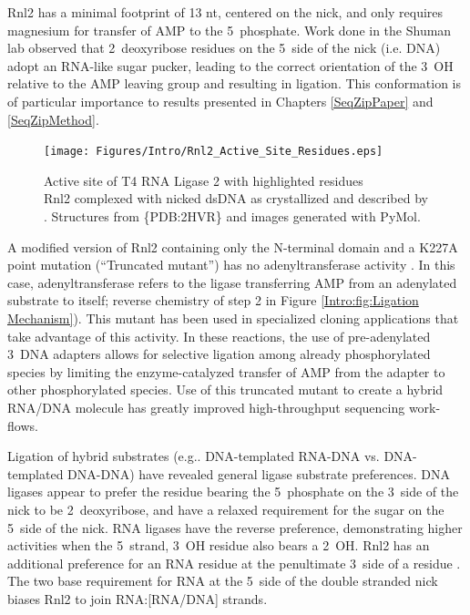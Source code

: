     Rnl2 has a minimal footprint of 13 nt, centered on the nick, and only requires magnesium for transfer of AMP to the 5\textprime~phosphate. Work done in the Shuman lab \citep{Nandakumar2006} observed that 2\textprime~deoxyribose residues on the 5\textprime~side of the nick (i.e. DNA) adopt an RNA-like sugar pucker, leading to the correct orientation of the 3\textprime~OH relative to the AMP leaving group and resulting in ligation. This conformation is of particular importance to results presented in Chapters \ref{SeqZipPaper} and \ref{SeqZipMethod}.

    \begin{figure} %
      \centering 
      \texttt{[image: Figures/Intro/Rnl2\_Active\_Site\_Residues.eps]}
      \caption[Active site of T4 RNA Ligase 2 with highlighted residues]
      {
        Active site of T4 RNA Ligase 2 with highlighted residues\\[0.25cm]
        Rnl2 complexed with nicked dsDNA as crystallized and described by \citep{Nandakumar2006}. Structures from \{PDB:2HVR\} and images generated with PyMol.
        }
      \label{Intro:fig:Rnl2 Active Site Residues}
      \end{figure}

    A modified version of Rnl2 containing only the N-terminal domain and a K227A point mutation (``Truncated mutant'') has no adenyltransferase activity \citep{Viollet2011}. In this case, adenyltransferase refers to the ligase transferring AMP from an adenylated substrate to itself; reverse chemistry of step 2 in Figure \ref{Intro:fig:Ligation Mechanism}). This mutant has been used in specialized cloning applications \citep{Ghildiyal2008, Hafner2008a, Viollet2011} that take advantage of this activity. In these reactions, the use of pre-adenylated 3\textprime~DNA adapters allows for selective ligation among already phosphorylated species by limiting the enzyme-catalyzed transfer of AMP from the adapter to other phosphorylated species. Use of this truncated mutant to create a hybrid RNA/DNA molecule has greatly improved high-throughput sequencing work-flows.

    Ligation of hybrid substrates (e.g.. DNA-templated RNA-DNA vs. DNA-templated DNA-DNA) have revealed general ligase substrate preferences. DNA ligases appear to prefer the residue bearing the 5\textprime~phosphate on the 3\textprime~side of the nick to be 2\textprime~deoxyribose, and have a relaxed requirement for the sugar on the 5\textprime~side of the nick. RNA ligases have the reverse preference, demonstrating higher activities when the 5\textprime~strand, 3\textprime~OH residue also bears a 2\textprime~OH. Rnl2 has an additional preference for an RNA residue at the penultimate 3\textprime~side of a residue \citep{Ho2002b,Ho2004, Nandakumar2004a, Nandakumar2006}. The two base requirement for RNA at the 5\textprime~side of the double stranded nick biases Rnl2 to join RNA:[RNA/DNA] strands. 

